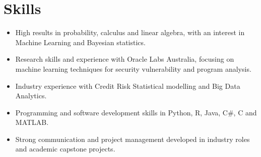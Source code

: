 \section*{Skills}

\begin{itemize}
    \setlength\itemsep{0.1em}
    \item High results in probability, calculus and linear algebra, with an interest in Machine Learning and Bayesian statistics.
    \item Research skills and experience with Oracle Labs Australia, focusing on machine learning techniques for security vulnerability and program analysis.
    \item Industry experience with Credit Risk Statistical modelling and Big Data Analytics.
    \item Programming and software development skills in Python, R, Java, C\#, C and MATLAB.
    \item Strong communication and project management developed in industry roles and academic capstone projects.
\end{itemize}